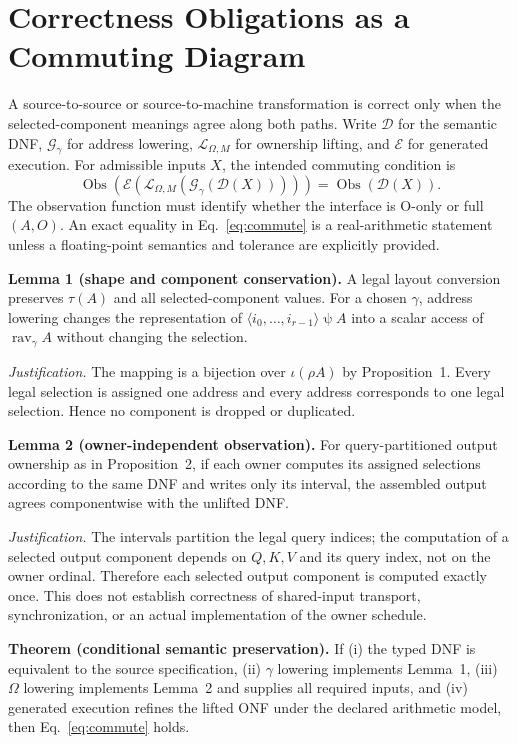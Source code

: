 \documentclass[sigplan,10pt,review,balance=false,pbalance=false]{acmart}
\newcommand{\ps}{\mathbin{\psi}}
\newcommand{\rav}{\operatorname{rav}}
\begin{document}
\section{Correctness Obligations as a Commuting Diagram}
A source-to-source or source-to-machine transformation is correct only when the selected-component meanings agree along both paths. Write $\mathcal D$ for the semantic DNF, $\mathcal G_\gamma$ for address lowering, $\mathcal L_{\Omega,M}$ for ownership lifting, and $\mathcal E$ for generated execution. For admissible inputs $X$, the intended commuting condition is
\begin{equation}
 \operatorname{Obs}(\mathcal E(\mathcal L_{\Omega,M}(\mathcal G_\gamma(\mathcal D(X)))))
 =\operatorname{Obs}(\mathcal D(X)).\label{eq:commute}
\end{equation}
The observation function must identify whether the interface is O-only or full $(A,O)$. An exact equality in Eq.~\eqref{eq:commute} is a real-arithmetic statement unless a floating-point semantics and tolerance are explicitly provided.

\textbf{Lemma 1 (shape and component conservation).} A legal layout conversion preserves $\tau(A)$ and all selected-component values. For a chosen $\gamma$, address lowering changes the representation of $\langle i_0,\ldots,i_{r-1}\rangle\ps A$ into a scalar access of $\rav_\gamma A$ without changing the selection.

\emph{Justification.} The mapping is a bijection over $\iota(\rho A)$ by Proposition~1. Every legal selection is assigned one address and every address corresponds to one legal selection. Hence no component is dropped or duplicated.

\textbf{Lemma 2 (owner-independent observation).} For query-partitioned output ownership as in Proposition~2, if each owner computes its assigned selections according to the same DNF and writes only its interval, the assembled output agrees componentwise with the unlifted DNF.

\emph{Justification.} The intervals partition the legal query indices; the computation of a selected output component depends on $Q,K,V$ and its query index, not on the owner ordinal. Therefore each selected output component is computed exactly once. This does not establish correctness of shared-input transport, synchronization, or an actual implementation of the owner schedule.

\textbf{Theorem (conditional semantic preservation).} If (i) the typed DNF is equivalent to the source specification, (ii) $\gamma$ lowering implements Lemma~1, (iii) $\Omega$ lowering implements Lemma~2 and supplies all required inputs, and (iv) generated execution refines the lifted ONF under the declared arithmetic model, then Eq.~\eqref{eq:commute} holds.
\end{document}
